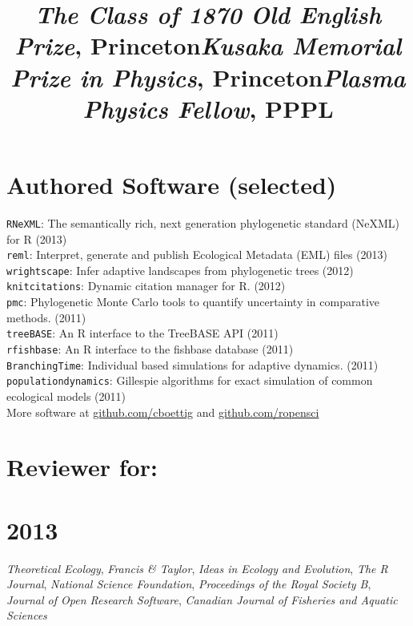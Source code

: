 \documentclass[margin]{res}
\begin{document}
\begin{resume}
\title{\emph{The Class of 1870 Old English Prize},  Princeton}
\begin{position}   \vspace{-.8cm} \end{position}

\title{\emph{Kusaka Memorial Prize in Physics}, Princeton}
\begin{position}   \vspace{-.8cm} \end{position}

\title{\emph{Plasma Physics Fellow},  PPPL }
\begin{position}   \vspace{-.8cm} \end{position}



  
  \section{Authored Software (selected)} 
{ \footnotesize
\texttt{RNeXML}: The semantically rich, next generation phylogenetic standard (NeXML) for R (2013) \\
\texttt{reml}: Interpret, generate and publish Ecological Metadata (EML) files (2013) \\
\texttt{wrightscape}: Infer adaptive landscapes from phylogenetic trees (2012) \\
\texttt{knitcitations}: Dynamic citation manager for R. (2012) \\
\texttt{pmc}: Phylogenetic Monte Carlo tools to quantify uncertainty in comparative methods. (2011)\\
\texttt{treeBASE}: An R interface to the TreeBASE API (2011) \\
\texttt{rfishbase}: An R interface to the fishbase database (2011) \\
\texttt{BranchingTime}: Individual based simulations for adaptive dynamics. (2011) \\
\texttt{populationdynamics}: Gillespie algorithms for exact simulation of common ecological models (2011) \\ 
More software at \href{http://github.com/cboettig}{github.com/cboettig} and \href{http://github.com/ropensci}{github.com/ropensci} 
}

\section{Reviewer for:}
\section{\textnormal{2013}}
\emph{Theoretical Ecology}, \emph{Francis \& Taylor}, \emph{Ideas in Ecology and Evolution}, \emph{The R Journal}, \emph{National Science Foundation}, \emph{Proceedings of the Royal Society B}, \emph{Journal of Open Research Software}, \emph{Canadian Journal of Fisheries and Aquatic Sciences} 


\end{resume}
\end{document}

